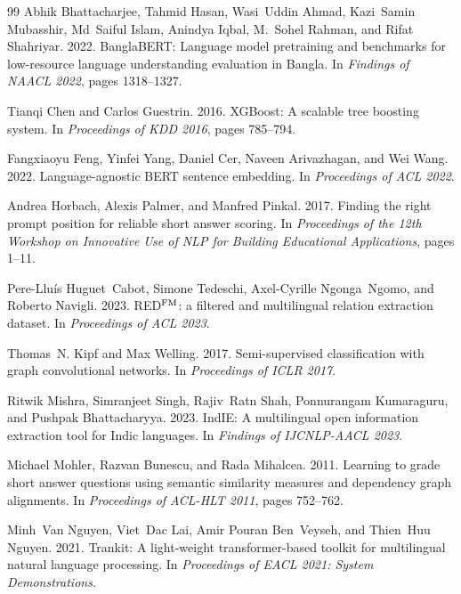 \documentclass[10pt,a4paper,twocolumn]{article}
\begin{document}
\small
\begin{thebibliography}{99}
Abhik Bhattacharjee, Tahmid Hasan, Wasi~Uddin Ahmad, Kazi~Samin Mubasshir, Md~Saiful Islam, Anindya Iqbal, M.~Sohel Rahman, and Rifat Shahriyar. 2022.
\newblock BanglaBERT: Language model pretraining and benchmarks for low-resource language understanding evaluation in Bangla.
\newblock In \emph{Findings of NAACL 2022}, pages 1318--1327.

Tianqi Chen and Carlos Guestrin. 2016.
\newblock XGBoost: A scalable tree boosting system.
\newblock In \emph{Proceedings of KDD 2016}, pages 785--794.

Fangxiaoyu Feng, Yinfei Yang, Daniel Cer, Naveen Arivazhagan, and Wei Wang. 2022.
\newblock Language-agnostic BERT sentence embedding.
\newblock In \emph{Proceedings of ACL 2022}.

Andrea Horbach, Alexis Palmer, and Manfred Pinkal. 2017.
\newblock Finding the right prompt position for reliable short answer scoring.
\newblock In \emph{Proceedings of the 12th Workshop on Innovative Use of NLP for Building Educational Applications}, pages 1--11.

Pere-Llu{\'i}s Huguet~Cabot, Simone Tedeschi, Axel-Cyrille Ngonga~Ngomo, and Roberto Navigli. 2023.
\newblock RED$^{\rm FM}$: a filtered and multilingual relation extraction dataset.
\newblock In \emph{Proceedings of ACL 2023}.

Thomas~N. Kipf and Max Welling. 2017.
\newblock Semi-supervised classification with graph convolutional networks.
\newblock In \emph{Proceedings of ICLR 2017}.

Ritwik Mishra, Simranjeet Singh, Rajiv~Ratn Shah, Ponnurangam Kumaraguru, and Pushpak Bhattacharyya. 2023.
\newblock IndIE: A multilingual open information extraction tool for Indic languages.
\newblock In \emph{Findings of IJCNLP-AACL 2023}.

Michael Mohler, Razvan Bunescu, and Rada Mihalcea. 2011.
\newblock Learning to grade short answer questions using semantic similarity measures and dependency graph alignments.
\newblock In \emph{Proceedings of ACL-HLT 2011}, pages 752--762.

Minh~Van Nguyen, Viet~Dac Lai, Amir Pouran Ben~Veyseh, and Thien~Huu Nguyen. 2021.
\newblock Trankit: A light-weight transformer-based toolkit for multilingual natural language processing.
\newblock In \emph{Proceedings of EACL 2021: System Demonstrations}.


\end{thebibliography}
\end{document}
